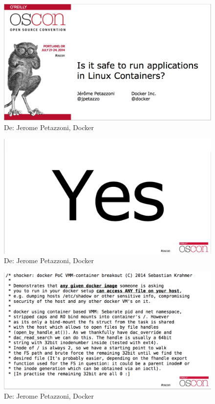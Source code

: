 \documentclass{bredelebeamer}
\begin{document}
\begin{frame}
	\begin{figure}
		\centering
		\includegraphics[width=\textwidth,height=0.8\textheight,keepaspectratio]{images/oscon1}
		\caption{De: Jerome Petazzoni, Docker}
	\end{figure}
\end{frame}
\begin{frame}
	\begin{figure}
		\centering
		\includegraphics[width=\textwidth,height=0.8\textheight,keepaspectratio]{images/oscon2}
		\caption{De: Jerome Petazzoni, Docker}
	\end{figure}
\end{frame}
\begin{frame}
	\begin{figure}
		\centering
		\includegraphics[width=\textwidth,height=0.8\textheight,keepaspectratio]{images/oscon3}
		\caption{De: Jerome Petazzoni, Docker}
	\end{figure}
\end{frame}
\end{document}
